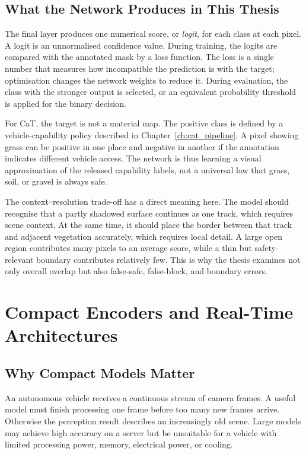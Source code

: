\subsection{What the Network Produces in This Thesis}

The final layer produces one numerical score, or \emph{logit}, for each class
at each pixel. A logit is an unnormalised confidence value. During training,
the logits are compared with the annotated mask by a loss function. The loss
is a single number that measures how incompatible the prediction is with the
target; optimisation changes the network weights to reduce it. During
evaluation, the class with the stronger output is selected, or an equivalent
probability threshold is applied for the binary decision.

For CaT, the target is not a material map. The positive class is defined by a
vehicle-capability policy described in Chapter~\ref{ch:cat_pipeline}. A pixel
showing grass can be positive in one place and negative in another if the
annotation indicates different vehicle access. The network is thus learning a
visual approximation of the released capability labels, not a universal law
that grass, soil, or gravel is always safe.

The context--resolution trade-off has a direct meaning here. The model should
recognise that a partly shadowed surface continues as one track, which requires
scene context. At the same time, it should place the border between that track
and adjacent vegetation accurately, which requires local detail. A large open
region contributes many pixels to an average score, while a thin but
safety-relevant boundary contributes relatively few. This is why the thesis
examines not only overall overlap but also false-safe, false-block, and boundary
errors.

\section{Compact Encoders and Real-Time Architectures}

\subsection{Why Compact Models Matter}

An autonomous vehicle receives a continuous stream of camera frames. A useful
model must finish processing one frame before too many new frames arrive.
Otherwise the perception result describes an increasingly old scene. Large
models may achieve high accuracy on a server but be unsuitable for a vehicle
with limited processing power, memory, electrical power, or cooling.

